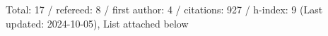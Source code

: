Total: 17 / refereed: 8 / first author: 4 / citations: 927 / h-index: 9 (Last updated: 2024-10-05), List attached below